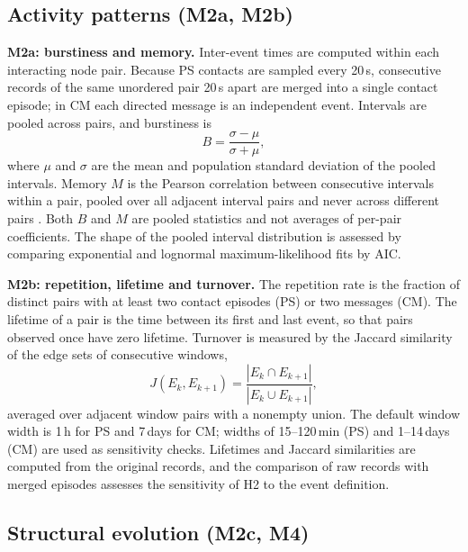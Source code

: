 \subsection{Activity patterns (M2a, M2b)}
\label{sec:m-activity}
\textbf{M2a: burstiness and memory.}
Inter-event times are computed within each interacting node pair. Because PS contacts are
sampled every 20\,s, consecutive records of the same unordered pair 20\,s apart are merged
into a single contact episode; in CM each directed message is an independent event.
Intervals are pooled across pairs, and burstiness is
\begin{equation}
B = \frac{\sigma-\mu}{\sigma+\mu},
\end{equation}
where $\mu$ and $\sigma$ are the mean and population standard deviation of the pooled
intervals. Memory $M$ is the Pearson correlation between consecutive intervals within a
pair, pooled over all adjacent interval pairs and never across different pairs
\citep{goh2008burstiness}. Both $B$ and $M$ are pooled statistics and not averages of
per-pair coefficients. The shape of the pooled interval distribution is assessed by
comparing exponential and lognormal maximum-likelihood fits by AIC.

\textbf{M2b: repetition, lifetime and turnover.}
The repetition rate is the fraction of distinct pairs with at least two contact episodes
(PS) or two messages (CM). The lifetime of a pair is the time between its first and last
event, so that pairs observed once have zero lifetime. Turnover is measured by the Jaccard
similarity of the edge sets of consecutive windows,
\begin{equation}
J(E_k,E_{k+1}) =
\frac{|E_k \cap E_{k+1}|}
{|E_k \cup E_{k+1}|},
\end{equation}
averaged over adjacent window pairs with a nonempty union. The default window width is
1\,h for PS and 7\,days for CM; widths of 15--120\,min (PS) and 1--14\,days (CM) are used
as sensitivity checks. Lifetimes and Jaccard similarities are computed from the original
records, and the comparison of raw records with merged episodes assesses the sensitivity
of H2 to the event definition.

\subsection{Structural evolution (M2c, M4)}
\label{sec:m-evolution}




